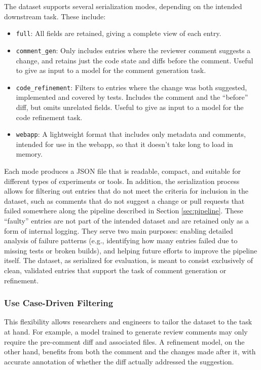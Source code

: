 The dataset supports several serialization modes, depending on the intended downstream task. These
include:
\begin{itemize}
	\item \texttt{full}: All fields are retained, giving a complete view of each entry.
	\item \texttt{comment\_gen}: Only includes entries where the reviewer comment suggests a change,
	      and retains just the code state and diffs before the comment. Useful to give as input to
	      a model for the comment generation task.
	\item \texttt{code\_refinement}: Filters to entries where the change was both suggested,
	      implemented and covered by tests. Includes the comment and the ``before'' diff, but omits
	      unrelated fields. Useful to give as input to a model for the code refinement task.
	\item \texttt{webapp}: A lightweight format that includes only metadata and comments, intended
	      for use in the webapp, so that it doesn't take long to load in memory.
\end{itemize}

Each mode produces a JSON file that is readable, compact, and suitable for different types of
experiments or tools. In addition, the serialization process allows for filtering out entries that
do not meet the criteria for inclusion in the dataset, such as comments that do not suggest a change
or pull requests that failed somewhere along the pipeline described in Section \ref{sec:pipeline}.
These “faulty” entries are not part of the intended dataset and are retained only as a form of
internal logging. They serve two main purposes: enabling detailed analysis of failure patterns
(e.g., identifying how many entries failed due to missing tests or broken builds), and helping
future efforts to improve the pipeline itself. The dataset, as serialized for
evaluation, is meant to consist exclusively of clean, validated entries that support the task of
comment generation or refinement.

\subsubsection{Use Case-Driven Filtering}

This flexibility allows researchers and engineers to tailor the dataset to the task at hand. For
example, a model trained to generate review comments may only require the pre-comment diff and
associated files. A refinement model, on the other hand, benefits from both the comment and the
changes made after it, with accurate annotation of whether the diff actually addressed the
suggestion.

